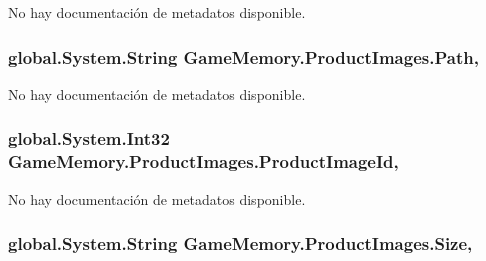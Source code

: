 No hay documentación de metadatos disponible. 

\hypertarget{class_game_memory_1_1_product_images_aefd90f7ad4877c35455246a5960d3376}{
\subsubsection[{Path}]{\setlength{\rightskip}{0pt plus 5cm}global.\-System.\-String Game\-Memory.\-Product\-Images.\-Path\hspace{0.3cm}{\ttfamily [get]}, {\ttfamily [set]}}}\label{class_game_memory_1_1_product_images_aefd90f7ad4877c35455246a5960d3376}


No hay documentación de metadatos disponible. 

\hypertarget{class_game_memory_1_1_product_images_a8a6332671d553f887bcc162b3882550b}{
\subsubsection[{Product\-Image\-Id}]{\setlength{\rightskip}{0pt plus 5cm}global.\-System.\-Int32 Game\-Memory.\-Product\-Images.\-Product\-Image\-Id\hspace{0.3cm}{\ttfamily [get]}, {\ttfamily [set]}}}\label{class_game_memory_1_1_product_images_a8a6332671d553f887bcc162b3882550b}


No hay documentación de metadatos disponible. 

\hypertarget{class_game_memory_1_1_product_images_a09eaad03141a7a6aee9bee592a826fbb}{
\subsubsection[{Size}]{\setlength{\rightskip}{0pt plus 5cm}global.\-System.\-String Game\-Memory.\-Product\-Images.\-Size\hspace{0.3cm}{\ttfamily [get]}, {\ttfamily [set]}}}\label{class_game_memory_1_1_product_images_a09eaad03141a7a6aee9bee592a826fbb}


